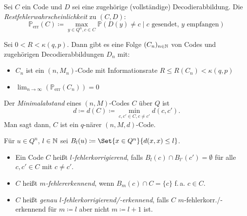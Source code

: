 \documentclass{cheat-sheet}
\renewcommand{\P}{\mathbb{P}} %
\newcommand{\CP}[2]{\P({#1}\mid{#2})} %
\newcommand{\err}{\text{err}} %
\begin{document}


\begin{defn}
  Sei $C$ ein Code und $D$ sei eine zugehörige (vollständige) Decodierabbildung.
  Die \emph{Restfehlerwahrscheinlichkeit} zu $(C, D)$:
  \[ \P_{\text{err}}(C) \coloneqq \max_{y \in Q^n, c \in C} \CP{D(y) \neq c}{\text{$c$ gesendet, $y$ empfangen}} \]
\end{defn}

\begin{satz}
  Sei $0 < R < \kappa(q, p)$.
  Dann gibt es eine Folge $(C_n)_{n \in \mathbb{N}}$ von Codes und zugehörigen Decodierabbildungen $D_n$ mit: %
  \begin{itemize}
    \item $C_n$ ist ein $(n, M_n)$-Code mit Informationsrate $R \!\leq\! R(C_n) \!<\! \kappa(q, p)$
    \item $\lim_{n \to \infty} \left( \P_\err(C_n) \right) = 0$
  \end{itemize}
\end{satz}



\begin{defn}
  Der \emph{Minimalabstand} eines $(n, M)$-Codes $C$ über $Q$ ist
  \[ d \coloneqq d(C) \coloneqq \min_{c,c' \in C, c \neq c'} d(c,c'). \]
  Man sagt dann, $C$ ist ein $q$-närer $(n, M, d)$-Code.
\end{defn}

\begin{nota}
  Für $u \in Q^n$, $l \in \mathbb{N}$ sei $B_l(u) \coloneqq \Set{x \in Q^n}{d(x, x) \leq l}$.
\end{nota}

\begin{defn}
  \begin{itemize}
    \item Ein Code $C$ heißt \emph{$l$-fehlerkorrigierend}, falls $B_l(c) \cap B_{l'}(c') = \emptyset$ für alle $c, c' \in C$ mit $c \neq c'$.
    \item $C$ heißt \emph{$m$-fehlererkennend}, wenn $B_m(c) \cap C = \{ c \}$ f.\,a. $c \in C$.
    \item $C$ heißt \emph{genau $l$-fehlerkorrigierend/-erkennend}, falls $C$ $m$-fehlerkorr./-erkennend für $m \coloneqq l$ aber nicht $m \coloneqq l+1$ ist.
  \end{itemize}
\end{defn}
\end{document}
